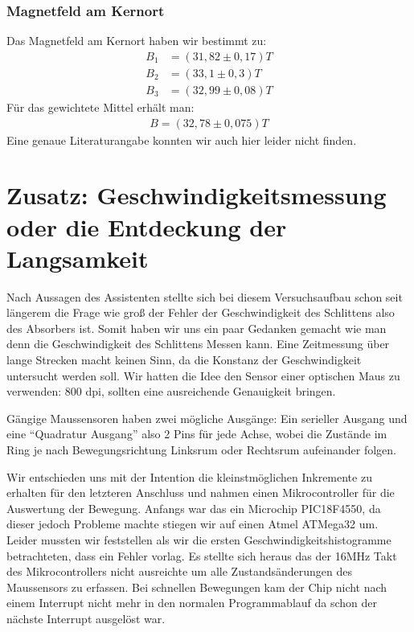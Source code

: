 \documentclass[12pt]{article}
\begin{document}
\subsubsection*{Magnetfeld am Kernort}
Das Magnetfeld am Kernort haben wir bestimmt zu:
\begin{align*}
  B_1 &= (31,82\pm0,17)T \\
 B_2 &= (33,1\pm0,3)T \\
 B_3 &= (32,99\pm0,08)T
\end{align*}
Für das gewichtete Mittel erhält man:
\begin{align*}
 B = (32,78 \pm 0,075)T
\end{align*}
Eine genaue Literaturangabe konnten wir auch hier leider nicht finden.


\section{Zusatz: Geschwindigkeitsmessung oder die Entdeckung der Langsamkeit}
Nach Aussagen des Assistenten stellte sich bei diesem Versuchsaufbau schon seit längerem die Frage wie groß der Fehler der Geschwindigkeit des Schlittens also des Absorbers ist. Somit haben wir uns ein paar Gedanken gemacht wie man denn die Geschwindigkeit des Schlittens Messen kann. Eine Zeitmessung über lange Strecken macht keinen Sinn, da die Konstanz der Geschwindigkeit untersucht werden soll. Wir hatten die Idee den Sensor einer optischen Maus zu verwenden: 800 dpi, sollten eine ausreichende Genauigkeit bringen.

Gängige Maussensoren haben zwei mögliche Ausgänge: Ein serieller Ausgang und eine ``Quadratur Ausgang'' also 2 Pins für jede Achse, wobei die Zustände im Ring je nach Bewegungsrichtung Linksrum oder Rechtsrum aufeinander folgen.

Wir entschieden uns mit der Intention die kleinstmöglichen Inkremente zu erhalten für den letzteren Anschluss und nahmen einen Mikrocontroller für die Auswertung der Bewegung. Anfangs war das ein Microchip PIC18F4550, da dieser jedoch Probleme machte stiegen wir auf einen Atmel ATMega32 um. Leider mussten wir feststellen als wir die ersten Geschwindigkeitshistogramme betrachteten, dass ein Fehler vorlag. Es stellte sich heraus das der 16MHz Takt des Mikrocontrollers nicht ausreichte um alle Zustandsänderungen des Maussensors zu erfassen. Bei schnellen Bewegungen kam der Chip nicht nach einem Interrupt nicht mehr in den normalen Programmablauf da schon der nächste Interrupt ausgelöst war.
\end{document}
